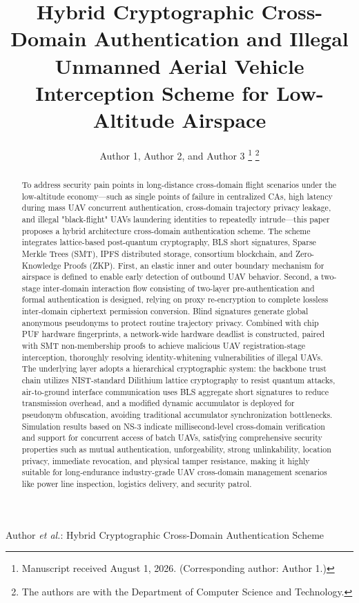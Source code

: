 \documentclass[lettersize,journal]{IEEEtran}
\begin{document}
\title{Hybrid Cryptographic Cross-Domain Authentication and Illegal Unmanned Aerial Vehicle Interception Scheme for Low-Altitude Airspace}

\author{Author 1, Author 2, and Author 3
\thanks{Manuscript received August 1, 2026. (Corresponding author: Author 1.)}%
\thanks{The authors are with the Department of Computer Science and Technology.}}

%
{Author \MakeLowercase{\textit{et al.}}: Hybrid Cryptographic Cross-Domain Authentication Scheme}

\maketitle

\begin{abstract}
To address security pain points in long-distance cross-domain flight scenarios under the low-altitude economy—such as single points of failure in centralized CAs, high latency during mass UAV concurrent authentication, cross-domain trajectory privacy leakage, and illegal "black-flight" UAVs laundering identities to repeatedly intrude—this paper proposes a hybrid architecture cross-domain authentication scheme. The scheme integrates lattice-based post-quantum cryptography, BLS short signatures, Sparse Merkle Trees (SMT), IPFS distributed storage, consortium blockchain, and Zero-Knowledge Proofs (ZKP). First, an elastic inner and outer boundary mechanism for airspace is defined to enable early detection of outbound UAV behavior. Second, a two-stage inter-domain interaction flow consisting of two-layer pre-authentication and formal authentication is designed, relying on proxy re-encryption to complete lossless inter-domain ciphertext permission conversion. Blind signatures generate global anonymous pseudonyms to protect routine trajectory privacy. Combined with chip PUF hardware fingerprints, a network-wide hardware deadlist is constructed, paired with SMT non-membership proofs to achieve malicious UAV registration-stage interception, thoroughly resolving identity-whitening vulnerabilities of illegal UAVs. The underlying layer adopts a hierarchical cryptographic system: the backbone trust chain utilizes NIST-standard Dilithium lattice cryptography to resist quantum attacks, air-to-ground interface communication uses BLS aggregate short signatures to reduce transmission overhead, and a modified dynamic accumulator is deployed for pseudonym obfuscation, avoiding traditional accumulator synchronization bottlenecks. Simulation results based on NS-3 indicate millisecond-level cross-domain verification and support for concurrent access of batch UAVs, satisfying comprehensive security properties such as mutual authentication, unforgeability, strong unlinkability, location privacy, immediate revocation, and physical tamper resistance, making it highly suitable for long-endurance industry-grade UAV cross-domain management scenarios like power line inspection, logistics delivery, and security patrol.
\end{abstract}
\end{document}
